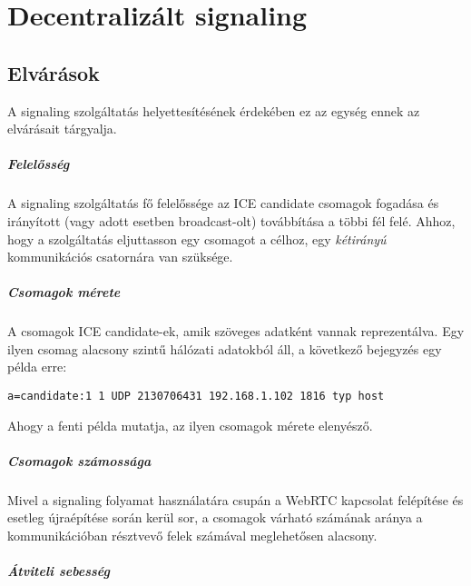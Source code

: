 \chapter{Decentralizált signaling}\label{ch:decentralizált-signaling}


\section{Elvárások}\label{sec:elvarasok}

A signaling szolgáltatás helyettesítésének érdekében ez az egység ennek az elvárásait tárgyalja.

\paragraph{Felelősség}

A signaling szolgáltatás fő felelőssége az ICE candidate csomagok fogadása és irányított (vagy adott esetben broadcast-olt)
továbbítása a többi fél felé.
Ahhoz, hogy a szolgáltatás eljuttasson egy csomagot a célhoz, egy \emph{kétirányú} kommunikációs csatornára van szüksége.

\paragraph{Csomagok mérete}

A csomagok ICE candidate-ek, amik szöveges adatként vannak reprezentálva.
Egy ilyen csomag alacsony szintű hálózati adatokból áll, a következő bejegyzés egy példa erre:
\begin{lstlisting}[label={lst:lstlisting}]
    a=candidate:1 1 UDP 2130706431 192.168.1.102 1816 typ host
\end{lstlisting}
Ahogy a fenti példa mutatja, az ilyen csomagok mérete elenyésző.

\paragraph{Csomagok számossága}

Mivel a signaling folyamat használatára csupán a WebRTC kapcsolat felépítése és esetleg újraépítése során kerül sor, a
csomagok várható számának aránya a kommunikációban résztvevő felek számával meglehetősen alacsony.

\paragraph{Átviteli sebesség}

